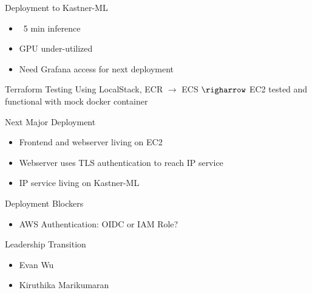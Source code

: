 
\begin{frame}{Deployment to Kastner-ML}
    \begin{itemize}
        \item ~5 min inference
        \item GPU under-utilized
        \item Need Grafana access for next deployment
    \end{itemize} 
\end{frame}

\begin{frame}{Terraform Testing}
    Using LocalStack, ECR $\rightarrow$ ECS $\righarrow$ EC2 tested and functional with mock docker container
\end{frame}

\begin{frame}{Next Major Deployment}
    \begin{itemize}
        \item Frontend and webserver living on EC2
        \item Webserver uses TLS authentication to reach IP service
        \item IP service living on Kastner-ML
    \end{itemize}
\end{frame}

\begin{frame}{Deployment Blockers}
    \begin{itemize}
        \item AWS Authentication: OIDC or IAM Role?
    \end{itemize}
\end{frame}

\begin{frame}{Leadership Transition}
    \begin{itemize}
        \item Evan Wu
        \item Kiruthika Marikumaran
    \end{itemize}
\end{frame}



